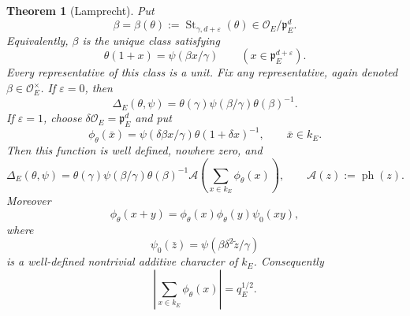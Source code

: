 \documentclass[11pt]{amsart}
\newtheorem{theorem}{Theorem}[section]
\theoremstyle{definition}
\theoremstyle{remark}
\newcommand{\cO}{\mathcal O}
\newcommand{\p}{\mathfrak p}
\newcommand{\ph}{\operatorname{ph}}
\newcommand{\Aphase}{\mathcal A}
\begin{document}
\begin{theorem}[Lamprecht]\label{thm:Lamprecht}
Put
\[
 \beta=\beta(\theta):=
 \operatorname{St}_{\gamma,d+\varepsilon}(\theta)
 \in\cO_E/\p_E^d.
\]
Equivalently, $\beta$ is the unique class satisfying
\begin{equation}\label{eq:Lamprecht-linearization}
 \theta(1+x)=\psi(\beta x/\gamma)
 \qquad(x\in\p_E^{d+\varepsilon}).
\end{equation}
Every representative of this class is a unit.  Fix any representative,
again denoted $\beta\in\cO_E^\times$.  If $\varepsilon=0$, then
\begin{equation}\label{eq:Lamprecht-even}
 \Delta_E(\theta,\psi)=
 \theta(\gamma)\psi(\beta/\gamma)\theta(\beta)^{-1}.
\end{equation}
If $\varepsilon=1$, choose $\delta\cO_E=\p_E^d$ and put
\begin{equation}\label{eq:Lamprecht-Hasse-function}
 \phi_\theta(\bar x)=
 \psi(\delta\beta x/\gamma)\theta(1+\delta x)^{-1},
 \qquad \bar x\in k_E.
\end{equation}
Then this function is well defined, nowhere zero, and
\begin{equation}\label{eq:Lamprecht-odd}
 \Delta_E(\theta,\psi)=
 \theta(\gamma)\psi(\beta/\gamma)\theta(\beta)^{-1}
 \Aphase\!\left(\sum_{x\in k_E}\phi_\theta(x)\right),
 \qquad \Aphase(z):=\ph(z).
\end{equation}
Moreover
\begin{equation}\label{eq:Hasse-functional-equation}
 \phi_\theta(x+y)=
 \phi_\theta(x)\phi_\theta(y)\psi_0(xy),
\end{equation}
where
\begin{equation}\label{eq:Lamprecht-residual-character}
 \psi_0(\bar z)=\psi(\beta\delta^2\widetilde z/\gamma)
\end{equation}
is a well-defined nontrivial additive character of $k_E$.  Consequently
\begin{equation}\label{eq:Lamprecht-Hasse-magnitude}
 \left|\sum_{x\in k_E}\phi_\theta(x)\right|=q_E^{1/2}.
\end{equation}
\end{theorem}
\end{document}
